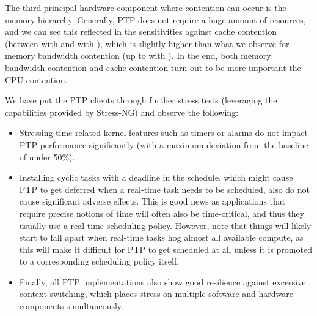 %
%
The third principal hardware component where contention can occur is the memory hierarchy. Generally, PTP does not require a huge amount of resources, and we can see this reflected in the sensitivities against cache contention (between \fRatio[1]{\cmpMin} with \fVendorCluster{\cmpMaxArg} and \fRatio[1]{\cmpMax} with \fVendorCluster{\cmpMaxArg}),%
%
%
which is slightly higher than what we observe for memory bandwidth contention (up to \fRatio{\cmpMax} with \fVendorCluster{\cmpMaxArg}).
%
In the end, both memory bandwidth contention and cache contention turn out to be more important the CPU contention.%
%

We have put the PTP clients through further stress tests (leveraging the capabilities provided by Stress-NG) and observe the following:%
\begin{itemize}
    \item Stressing time-related kernel features such as timers or alarms do not impact PTP performance significantly (with a maximum deviation from the baseline of under 50\%).
    \item Installing cyclic tasks with a deadline in the schedule, which might cause PTP to get deferred when a real-time task needs to be scheduled, also do not cause significant adverse effects. This is good news as applications that require precise notions of time will often also be time-critical, and thus they usually use a real-time scheduling policy. However, note that things will likely start to fall apart when real-time tasks hog almost all available compute, as this will make it difficult for PTP to get scheduled at all unless it is promoted to a corresponding scheduling policy itself.
    \item Finally, all PTP implementations also show good resilience against excessive context switching, which places stress on multiple software and hardware components simultaneously.
\end{itemize}


